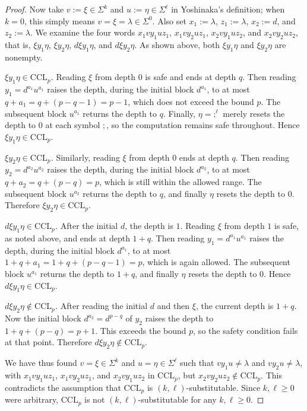 \documentclass[11pt,a4paper]{article}
\begin{document}
\begin{proof}
Now take $v := \xi \in \Sigma^k$ and $u := \eta \in \Sigma^\ell$ in Yoshinaka's definition; when $k=0$, this simply means $v=\xi=\lambda \in \Sigma^0$. Also set $x_1 := \lambda$, $z_1 := \lambda$, $x_2 := d$, and $z_2 := \lambda$. We examine the four words $x_1 v y_1 u z_1$, $x_1 v y_2 u z_1$, $x_2 v y_1 u z_2$, and $x_2 v y_2 u z_2$, that is, $\xi y_1 \eta$, $\xi y_2 \eta$, $d \xi y_1 \eta$, and $d \xi y_2 \eta$. As shown above, both $\xi y_1 \eta$ and $\xi y_2 \eta$ are nonempty.

\smallskip\noindent\emph{$\xi y_1 \eta \in \mathrm{CCL}_p$.}
Reading $\xi$ from depth $0$ is safe and ends at depth $q$. Then reading $y_1 = d^{a_1}u^{a_1}$ raises the depth, during the initial block $d^{a_1}$, to at most $q+a_1 = q+(p-q-1)=p-1$, which does not exceed the bound $p$. The subsequent block $u^{a_1}$ returns the depth to $q$. Finally, $\eta = ;^\ell$ merely resets the depth to $0$ at each symbol $;$, so the computation remains safe throughout. Hence $\xi y_1 \eta \in \mathrm{CCL}_p$.

\smallskip\noindent\emph{$\xi y_2 \eta \in \mathrm{CCL}_p$.}
Similarly, reading $\xi$ from depth $0$ ends at depth $q$. Then reading $y_2 = d^{a_2}u^{a_2}$ raises the depth, during the initial block $d^{a_2}$, to at most $q+a_2 = q+(p-q)=p$, which is still within the allowed range. The subsequent block $u^{a_2}$ returns the depth to $q$, and finally $\eta$ resets the depth to $0$. Therefore $\xi y_2 \eta \in \mathrm{CCL}_p$.

\smallskip\noindent\emph{$d \xi y_1 \eta \in \mathrm{CCL}_p$.}
After the initial $d$, the depth is $1$. Reading $\xi$ from depth $1$ is safe, as noted above, and ends at depth $1+q$. Then reading $y_1 = d^{a_1}u^{a_1}$ raises the depth, during the initial block $d^{a_1}$, to at most $1+q+a_1 = 1+q+(p-q-1)=p$, which is again allowed. The subsequent block $u^{a_1}$ returns the depth to $1+q$, and finally $\eta$ resets the depth to $0$. Hence $d \xi y_1 \eta \in \mathrm{CCL}_p$.

\smallskip\noindent\emph{$d \xi y_2 \eta \notin \mathrm{CCL}_p$.}
After reading the initial $d$ and then $\xi$, the current depth is $1+q$. Now the initial block $d^{a_2} = d^{p-q}$ of $y_2$ raises the depth to $1+q+(p-q)=p+1$. This exceeds the bound $p$, so the safety condition fails at that point. Therefore $d \xi y_2 \eta \notin \mathrm{CCL}_p$.

We have thus found $v=\xi \in \Sigma^k$ and $u=\eta \in \Sigma^\ell$ such that $v y_1 u \neq \lambda$ and $v y_2 u \neq \lambda$, with $x_1 v y_1 u z_1$, $x_1 v y_2 u z_1$, and $x_2 v y_1 u z_2$ in $\mathrm{CCL}_p$, but $x_2 v y_2 u z_2 \notin \mathrm{CCL}_p$. This contradicts the assumption that $\mathrm{CCL}_p$ is $(k,\ell)$-substitutable. Since $k,\ell \ge 0$ were arbitrary, $\mathrm{CCL}_p$ is not $(k,\ell)$-substitutable for any $k,\ell \ge 0$.
\end{proof}
\end{document}
